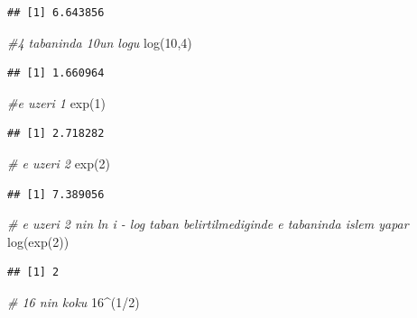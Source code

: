 \documentclass[
]{book}
\newenvironment{Shaded}{\begin{snugshade}}{\end{snugshade}}
\newcommand{\CommentTok}[1]{\textcolor[rgb]{0.56,0.35,0.01}{\textit{#1}}}
\newcommand{\DecValTok}[1]{\textcolor[rgb]{0.00,0.00,0.81}{#1}}
\newcommand{\FunctionTok}[1]{\textcolor[rgb]{0.00,0.00,0.00}{#1}}
\newcommand{\NormalTok}[1]{#1}
\newcommand{\SpecialCharTok}[1]{\textcolor[rgb]{0.00,0.00,0.00}{#1}}
\begin{document}
\begin{verbatim}
## [1] 6.643856
\end{verbatim}

\begin{Shaded}
\begin{Highlighting}[]
\CommentTok{\#4 tabaninda 10un log\textquotesingle{}u}
\FunctionTok{log}\NormalTok{(}\DecValTok{10}\NormalTok{,}\DecValTok{4}\NormalTok{) }
\end{Highlighting}
\end{Shaded}

\begin{verbatim}
## [1] 1.660964
\end{verbatim}

\begin{Shaded}
\begin{Highlighting}[]
\CommentTok{\#e uzeri 1}
\FunctionTok{exp}\NormalTok{(}\DecValTok{1}\NormalTok{) }
\end{Highlighting}
\end{Shaded}

\begin{verbatim}
## [1] 2.718282
\end{verbatim}

\begin{Shaded}
\begin{Highlighting}[]
\CommentTok{\# e uzeri 2}
\FunctionTok{exp}\NormalTok{(}\DecValTok{2}\NormalTok{) }
\end{Highlighting}
\end{Shaded}

\begin{verbatim}
## [1] 7.389056
\end{verbatim}

\begin{Shaded}
\begin{Highlighting}[]
 \CommentTok{\# e uzeri 2 nin ln i {-} log taban belirtilmediginde e tabaninda islem yapar}
\FunctionTok{log}\NormalTok{(}\FunctionTok{exp}\NormalTok{(}\DecValTok{2}\NormalTok{))}
\end{Highlighting}
\end{Shaded}

\begin{verbatim}
## [1] 2
\end{verbatim}

\begin{Shaded}
\begin{Highlighting}[]
\CommentTok{\# 16 nin koku}
\DecValTok{16}\SpecialCharTok{\^{}}\NormalTok{(}\DecValTok{1}\SpecialCharTok{/}\DecValTok{2}\NormalTok{)}
\end{Highlighting}
\end{Shaded}
\end{document}

